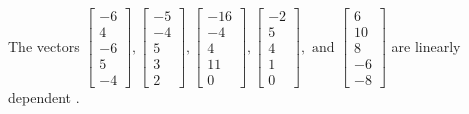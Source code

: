 \begin{exercise}
\begin{exerciseStatement}
  \end{exerciseStatement}
  \begin{exerciseAnswer}
   The vectors \(\left[\begin{array}{r}
-6 \\
4 \\
-6 \\
5 \\
-4
\end{array}\right] , \left[\begin{array}{r}
-5 \\
-4 \\
5 \\
3 \\
2
\end{array}\right] , \left[\begin{array}{r}
-16 \\
-4 \\
4 \\
11 \\
0
\end{array}\right] , \left[\begin{array}{r}
-2 \\
5 \\
4 \\
1 \\
0
\end{array}\right] , \text{ and } \left[\begin{array}{r}
6 \\
10 \\
8 \\
-6 \\
-8
\end{array}\right]\) are 
  	 linearly dependent  .
  


  \end{exerciseAnswer}
\end{exercise}
